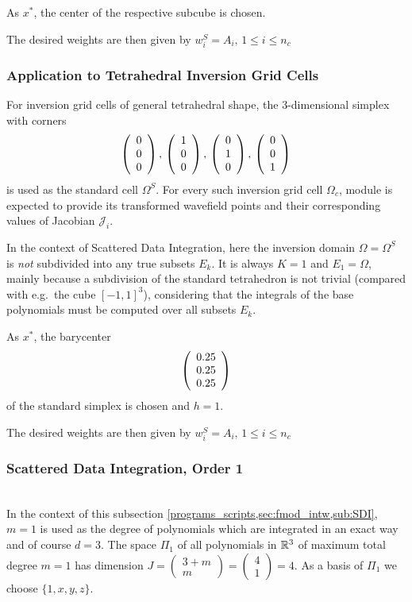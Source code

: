 As $x^\ast$, the center of the respective subcube is chosen.

The desired weights \weightsS are then given by $w^S_i = A_i,\,1\le i\le n_c$
%
\subsubsection{Application to Tetrahedral Inversion Grid Cells}
%
For inversion grid cells of general tetrahedral shape, the 3-dimensional simplex with corners
\[
\left( \begin{array}{c} 0 \\ 0 \\ 0 \end{array} \right) ,\, \left( \begin{array}{c} 1 \\ 0 \\ 0 \end{array} \right) ,\, \left( \begin{array}{c} 0 \\ 1 \\ 0 \end{array} \right) ,\, \left( \begin{array}{c} 0 \\ 0 \\ 1 \end{array} \right)
\]
is used as the standard cell $\Omega^S$. For every such inversion grid cell $\Omega_c$, module 
 is expected to provide its transformed wavefield points \wpS and their 
corresponding values of Jacobian $\mathcal{J}_i$.

In the context of Scattered Data Integration, here the inversion domain $\Omega = \Omega^S$ is \emph{not} 
subdivided into any true subsets $E_k$. It is always $K=1$ and $E_1 = \Omega$, mainly because a subdivision 
of the standard tetrahedron is not trivial (compared with e.g.\ the cube $[-1,1]^3$), considering that the integrals 
of the base polynomials must be computed over all subsets $E_k$. 

As $x^\ast$, the barycenter \[ \left( \begin{array}{c} 0.25 \\ 0.25 \\ 0.25 \end{array} \right) \] of the standard simplex is chosen and $h = 1$.

The desired weights \weightsS are then given by $w^S_i = A_i,\,1\le i\le n_c$
%
\subsubsection{Scattered Data Integration, Order 1}
%
\\
In the context of this subsection \ref{programs_scripts,sec:fmod_intw,sub:SDI}, $m=1$ is used as the 
degree of polynomials which are integrated in an exact way and of course $d=3$. The space $\Pi_1$ of all polynomials in 
$\mathbb{R}^3$ of maximum total degree $m=1$ has dimension $J = \left(\begin{array}{c} 3+m \\ m \end{array}\right) 
= \left(\begin{array}{c} 4 \\ 1 \end{array}\right) = 4$. As a basis of $\Pi_1$ we choose 
$\big\{1,\allowbreak x,\allowbreak y,\allowbreak z\big\}$.
%
